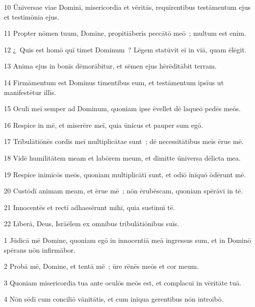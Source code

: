 \psalmVerse
  {\phantom{0}10}
  {Ūniversae viae Dominī, misericordia et vēritās, requīrentibus testāmentum ejus et testimōnia ejus.}


\psalmVerse
  {\phantom{0}11}
  {Propter nōmen tuum, Domine, propitiāberis peccātō meō~; multum est enim.}


\psalmVerse
  {\phantom{0}12}
  {¿~Quis est homō quī timet Dominum~? Lēgem statūvit eī in viā, quam ēlēgit.}


\psalmVerse
  {\phantom{0}13}
  {Anima ejus in bonīs dēmorābitur, et sēmen ejus hērēditābit terram.}


\psalmVerse
  {\phantom{0}14}
  {Firmāmentum est Dominus timentibus eum, et testāmentum ipsīus ut manifestētur illīs.}


\psalmVerse
  {\phantom{0}15}
  {Oculī meī semper ad Dominum, quoniam ipse ēvellet dē laqueō pedēs meōs.}


\psalmVerse
  {\phantom{0}16}
  {Respice in mē, et miserēre meī, quia ūnicus et pauper sum egō.}


\psalmVerse
  {\phantom{0}17}
  {Trībulātiōnēs cordis meī multiplicātae sunt~; dē necessitātibus meīs ērue mē.}


\psalmVerse
  {\phantom{0}18}
  {Vidē humilitātem meam et labōrem meum, et dīmitte ūniversa dēlicta mea.}


\psalmVerse
  {\phantom{0}19}
  {Respice inimīcōs meōs, quoniam multiplicātī sunt, et odiō inīquō ōdērunt mē.}


\psalmVerse
  {\phantom{0}20}
  {Custōdī animam meam, et ērue mē~; nōn ērubēscam, quoniam spērāvī in tē.}


\psalmVerse
  {\phantom{0}21}
  {Innocentēs et rectī adhaesērunt mihī, quia sustinuī tē.}


\psalmVerse
  {\phantom{0}22}
  {Līberā, Deus, Isrāēlem ex omnibus trībulātiōnibus suīs.}



\psalmVerse
  {\phantom{00}1}
  {Jūdicā mē Domine, quoniam egō in innocentiā meā ingressus sum, et in Dominō spērans nōn infirmābor.}


\psalmVerse
  {\phantom{00}2}
  {Probā mē, Domine, et tentā mē~; ūre rēnēs meōs et cor meum.}


\psalmVerse
  {\phantom{00}3}
  {Quoniam misericordia tua ante oculōs meōs est, et complacuī in vēritāte tuā.}


\psalmVerse
  {\phantom{00}4}
  {Nōn sēdī cum conciliō vānitātis, et cum inīqua gerentibus nōn introībō.}


